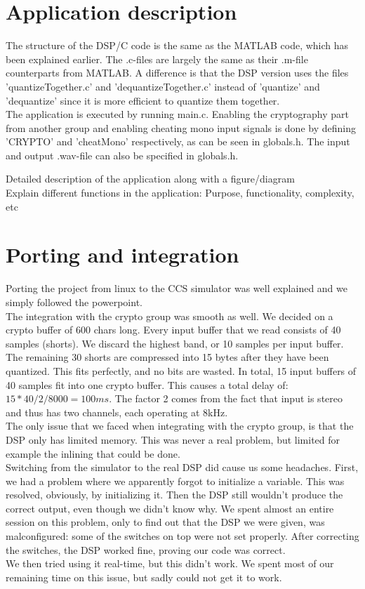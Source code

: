 \documentclass[a4paper]{article}
\begin{document}
\section{Application description}
The structure of the DSP/C code is the same as the MATLAB code, which has been explained earlier. The .c-files are largely the same as their .m-file counterparts from MATLAB. A difference is that the DSP version uses the files 'quantizeTogether.c' and 'dequantizeTogether.c' instead of 'quantize' and 'dequantize' since it is more efficient to quantize them together.\\
The application is executed by running main.c. Enabling the cryptography part from another group and enabling cheating mono input signals is done by defining 'CRYPTO' and 'cheatMono' respectively, as can be seen in globals.h. The input and output .wav-file can also be specified in globals.h.






Detailed description of the application along with a figure/diagram \\
Explain different functions in the application: Purpose, functionality, complexity, etc



\section{Porting and integration}
Porting the project from linux to the CCS simulator was well explained and we simply followed the powerpoint. \\
The integration with the crypto group was smooth as well. We decided on a crypto buffer of 600 chars long. Every input buffer that we read consists of 40 samples (shorts). We discard the highest band, or 10 samples per input buffer. The remaining 30 shorts are compressed into 15 bytes after they have been quantized. This fits perfectly, and no bits are wasted. In total, 15 input buffers of 40 samples fit into one crypto buffer. This causes a total delay of: $15*40/2/8000 = 100ms$. The factor 2 comes from the fact that input is stereo and thus has two channels, each operating at 8kHz. \\
The only issue that we faced when integrating with the crypto group, is that the DSP only has limited memory. This was never a real problem, but limited for example the inlining that could be done. \\
Switching from the simulator to the real DSP did cause us some headaches. First, we had a problem where we apparently forgot to initialize a variable. This was resolved, obviously, by initializing it. Then the DSP still wouldn't produce the correct output, even though we didn't know why. We spent almost an entire session on this problem, only to find out that the DSP we were given, was malconfigured: some of the switches on top were not set properly. After correcting the switches, the DSP worked fine, proving our code was correct. \\
We then tried using it real-time, but this didn't work. We spent most of our remaining time on this issue, but sadly could not get it to work.
\end{document}

